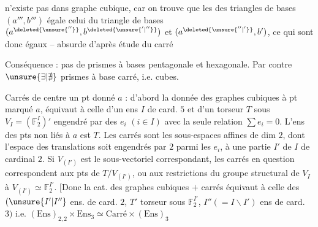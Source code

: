 n'existe pas dans graphe cubique, car on trouve que les  des triangles de bases $(a''',b''')$ égale celui du triangle de bases $(a^{\deleted{\unsure{''}}},b^{\deleted{\unsure{'|''}}})$ et $(a^{\deleted{\unsure{''|'}}},b')$, ce qui sont donc égaux -- absurde d'après étude du carré

Conséquence : pas de prismes à bases pentagonale et hexagonale. Par contre $\unsure{\exists|\nexists}$ prismes à base carré, i.e. cubes.


Carrés de centre un pt donné $a$ : d'abord la donnée des graphes cubiques à pt marqué $a$, équivaut à celle d'un ens $I$ de card. $5$ et d'un torseur $T$ sous $V_I=(\mathbb F_2^I)'$  engendré par des $e_i$ $(i\in I)$ avec la seule relation $\sum e_i=0$. L'ens des pts non liés à $a$ est $T$. Les  carrés sont les sous-espaces affines de dim $2$, dont l'espace des translations soit engendrés par $2$ parmi les $e_i$,  à une partie $I'$ de $I$ de cardinal $2$. Si $V_{(I')}$ est le sous-vectoriel correspondant, les carrés en question correspondent aux pts de $T/V_{(I')}$, ou aux restrictions du groupe structural de $V_I$ à $V_{(I')}\simeq\mathbb F_2^{I'}$. $[$Donc la cat. des graphes cubiques $+$ carrés équivaut à celle des   $(\unsure{I'|I''}$ ens. de card. $2$, $T'$ torseur sous $\mathbb F_2^{I'}$, $I''(=I\backslash I')$ ens de card. $3)$ i.e. $(\mathrm{Ens})_{2,2}\times\mathrm{Ens}_3\simeq\text{Carré}\times(\mathrm{Ens})_3$

